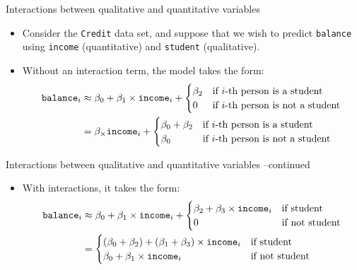 \documentclass[aspectratio=169, 11pt]{beamer}
\begin{document}
\begin{frame}{Interactions between qualitative and quantitative variables}
  \begin{itemize}
    \item Consider the \texttt{Credit} data set, and suppose that we wish to predict \texttt{balance} using \texttt{income} (quantitative) and \texttt{student} (qualitative).

    \item Without an interaction term, the model takes the form:
      \begin{align*}
        \text{\texttt{balance}}_i & \approx \beta_0 + \beta_1 \times  \text{\texttt{income}}_i + \begin{cases} \beta_2 & \text{if } i\text{-th person is a student} \\ 0 & \text{if } i\text{-th person is not a student} \end{cases} \\
                                  & = \beta_ \times \text{\texttt{income}}_i + \begin{cases} \beta_0 + \beta_2 & \text{if } i\text{-th person is a student} \\ \beta_0 & \text{if } i\text{-th person is not a student} \end{cases}
      \end{align*}
  \end{itemize}
\end{frame}

\begin{frame}{Interactions between qualitative and quantitative variables --continued}
  \begin{itemize}
    \item With interactions, it takes the form:
      \begin{align*}
        \text{\texttt{balance}}_i & \approx \beta_0 + \beta_1 \times  \text{\texttt{income}}_i +
          \begin{cases}
            \beta_2 + \beta_3 \times \text{\texttt{income}}_i & \text{if student} \\
            0 & \text{if not student}
          \end{cases} \\
          & =
            \begin{cases}
              (\beta_0 + \beta_2) + (\beta_1 + \beta_3) \times \text{\texttt{income}}_i & \text{if student} \\
              \beta_0 + \beta_1 \times \text{\texttt{income}}_i & \text{if not student}
            \end{cases}
      \end{align*}
  \end{itemize}
\end{frame}
\end{document}
